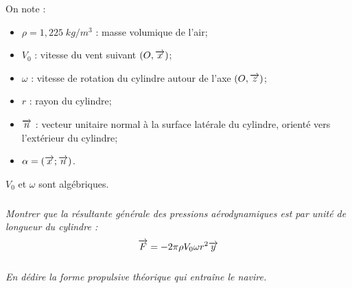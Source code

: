 \documentclass[10pt]{article}
\begin{document}
On note : 
\begin{itemize}
\item $\rho=1,225\; kg/m^3$ : masse volumique de l'air; 
\item $V_0$ : vitesse du vent suivant $(O,\overrightarrow{x})$;
\item $\omega$ : vitesse de rotation du cylindre autour de l'axe $(O,\overrightarrow{z})$;
\item $r$ : rayon du cylindre;
\item $\overrightarrow{n}$ : vecteur unitaire normal à la surface latérale du cylindre, orienté vers l'extérieur du cylindre;
\item $\alpha = \left( \overrightarrow{x};\overrightarrow{n}\right)$.
\end{itemize}

$V_0$ et $\omega$ sont algébriques.

\subparagraph{}
\textit{Montrer que la résultante générale des pressions aérodynamiques est par unité de longueur du cylindre :
$$
\overrightarrow{F}=-2\pi \rho  V_0 \omega r^2 \overrightarrow{y}
$$}

\subparagraph{}
\textit{En dédire la forme propulsive théorique qui entraîne le navire.}
\end{document}
